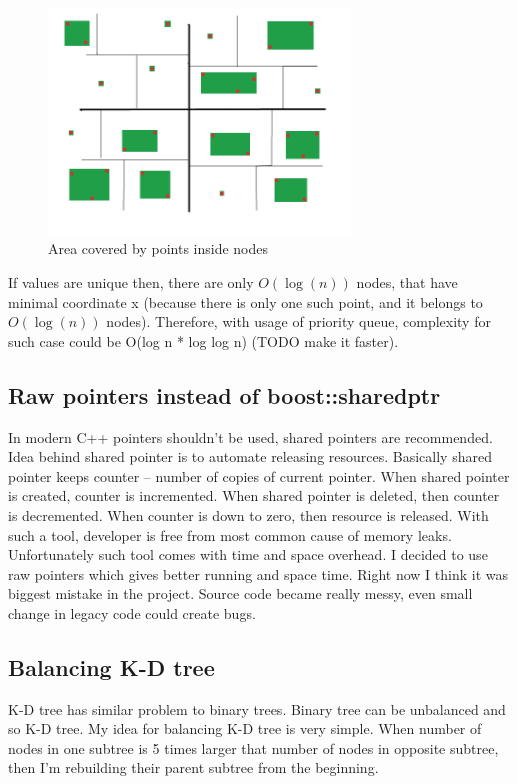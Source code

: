 \documentclass[10pt,a4paper]{article}
\begin{document}
\begin{figure}
\centering
  \includegraphics[width=8cm]{simple_boundary2.png}%
  \caption{Area covered by points inside nodes}
\end{figure}

If values are unique then, there are only $O(\log (n))$ nodes, that have minimal coordinate x (because there is only one such point, and it belongs to $O(\log (n))$ nodes). Therefore, with
usage of priority queue, complexity for such case could be O(log n * log log n) (TODO make it faster).

\subsection{Raw pointers instead of boost::shared\textunderscore ptr}

In modern C++ pointers shouldn't be used, shared pointers are recommended. Idea behind shared pointer is to automate releasing resources. Basically shared pointer keeps counter – number of copies of current pointer. When shared pointer is created, counter is incremented. When shared pointer is deleted, then counter is decremented. When counter is down to zero, then resource is released. With such a tool, developer is free from most common cause of memory leaks. Unfortunately such tool comes with time and space overhead. I decided to use raw pointers which gives better running and space time.
Right now I think it was biggest mistake in the project. Source code became really messy, even small change in legacy code could create bugs.

\subsection{Balancing K-D tree}
K-D tree has similar problem to binary trees. Binary tree can be unbalanced and so K-D tree. My idea for balancing K-D tree is very simple. When number of nodes in one subtree is 5 times larger that number of nodes in opposite subtree, then I'm rebuilding their parent subtree from the beginning.
\end{document}
